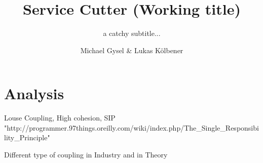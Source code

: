 \documentclass[hsr-ba,english]{hgbthesis}
\begin{document}

\bigskipamount=30pt

\title{Service Cutter (Working title)}
\subtitle{a catchy subtitle...}
\author{Michael Gysel \& Lukas K\"{o}lbener}



\frontmatter
\maketitle
\setcounter{tocdepth}{1}
\tableofcontents

			

\mainmatter         %

\makeatletter
\renewcommand{\@makechapterhead}[1]{%
\vspace*{50 pt}%
{\setlength{\parindent}{0pt} \raggedright \normalfont
\bfseries\Huge\thechapter.\ #1
\par\nobreak\vspace{40 pt}}}
\makeatother





\chapter{Analysis}
\label{cha:analysis}

Louse Coupling, High cohesion, SIP
"http://programmer.97things.oreilly.com/wiki/index.php/The\_Single\_Responsibility\_Principle"

Different type of coupling in Industry and in Theory
\end{document}
